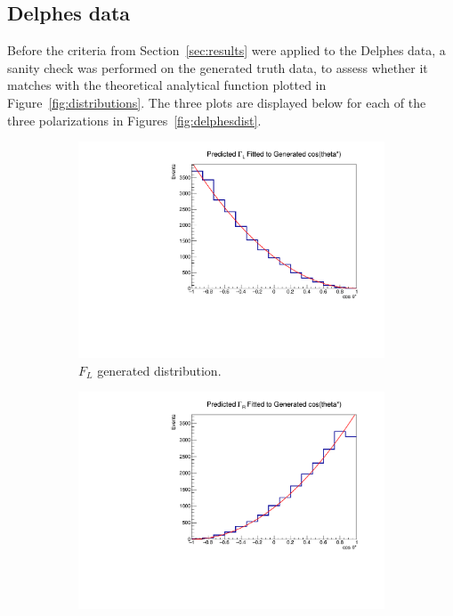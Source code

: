 \documentclass[12pt,a4paper]{article}
\numberwithin{equation}{section}
\begin{document}

\subsection{Delphes data}
Before the criteria from Section~\ref{sec:results} were applied to the Delphes
data, a sanity check was performed on the generated truth data, to assess
whether it matches with the theoretical analytical function plotted in
Figure~\ref{fig:distributions}. The three plots are displayed below for each of
the three polarizations in Figures~\ref{fig:delphesdist}.\\

\begin{figure}[t!]
    \centering
    \begin{subfigure}[t]{0.5\textwidth}
        \centering
        \includegraphics[width=1.0\textwidth]{figures/delphes_genL}
        \caption{$F_L$ generated distribution.}
    \end{subfigure}%
    \begin{subfigure}[t]{0.5\textwidth}
        \centering
        \includegraphics[width=1.0\textwidth]{figures/delphes_genR}

\end{subfigure}
\end{figure}
\end{document}
